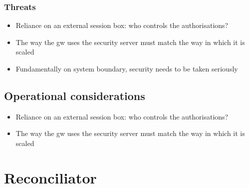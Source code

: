 \documentclass[10pt,a4paper]{article}
\begin{document}
\subsubsection{Threats}
	\begin{itemize}
		\item Reliance on an external session box: who controls the authorisations?
		\item The way the gw uses the security server must match the way in which it is scaled
		\item Fundamentally on system boundary, security needs to be taken seriously
	\end{itemize} 


\subsection{Operational considerations}
	\begin{itemize}
		\item Reliance on an external session box: who controls the authorisations?
		\item The way the gw uses the security server must match the way in which it is scaled
	\end{itemize} 


 
\section{Reconciliator}
\label{sec:p:9}
\end{document}
